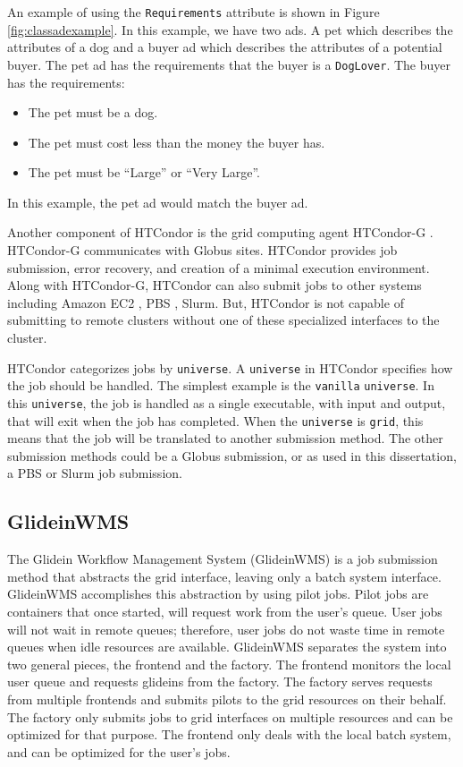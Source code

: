 An example of using the \texttt{Requirements} attribute is shown in Figure \ref{fig:classadexample}.  In this example, we have two ads.  A pet which describes the attributes of a dog and a buyer ad which describes the attributes of a potential buyer.  The pet ad has the requirements that the buyer is a \texttt{DogLover}.  The buyer has the requirements:

\begin{itemize}
	\item The pet must be a dog.
	\item The pet must cost less than the money the buyer has.
	\item The pet must be ``Large'' or ``Very Large''.
\end{itemize}

In this example, the pet ad would match the buyer ad.

Another component of HTCondor is the grid computing agent HTCondor-G \cite{frey2002condor}.  HTCondor-G communicates with Globus \cite{foster1997globus} sites.  HTCondor provides job submission, error recovery, and creation of a minimal execution environment.  Along with HTCondor-G, HTCondor can also submit jobs to other systems including Amazon EC2 \cite{amazonec2}, PBS \cite{pbstorque}, Slurm.  But, HTCondor is not capable of submitting to remote clusters without one of these specialized interfaces to the cluster.

HTCondor categorizes jobs by \texttt{universe}.  A \texttt{universe} in HTCondor specifies how the job should be handled.  The simplest example is the \texttt{vanilla} \texttt{universe}.  In this \texttt{universe}, the job is handled as a single executable, with input and output, that will exit when the job has completed.  When the \texttt{universe} is \texttt{grid}, this means that the job will be translated to another submission method.  The other submission methods could be a Globus submission, or as used in this dissertation, a PBS or Slurm job submission.





\subsection{GlideinWMS}
The Glidein Workflow Management System (GlideinWMS) \cite{sfiligoi2008glideinwms} is a job submission method that abstracts the grid interface, leaving only a batch system interface.  GlideinWMS accomplishes this abstraction by using pilot jobs.  Pilot jobs are containers that once started, will request work from the user's queue.  User jobs will not wait in remote queues; therefore, user jobs do not waste time in remote queues when idle resources are available.  GlideinWMS separates the system into two general pieces, the frontend and the factory.  The frontend monitors the local user queue and requests glideins from the factory.  The factory serves requests from multiple frontends and submits pilots to the grid resources on their behalf.  The factory only submits jobs to grid interfaces on multiple resources and can be optimized for that purpose.  The frontend only deals with the local batch system, and can be optimized for the user's jobs.
 
